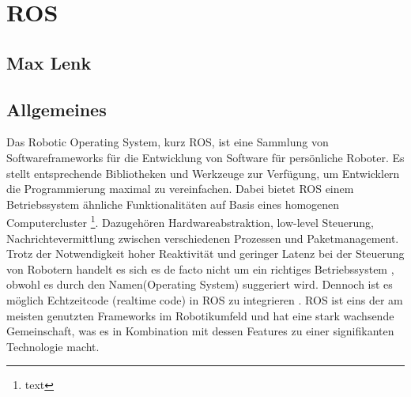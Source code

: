 \section{ROS}
\subsection*{Max Lenk}
\label{ROS}
\subsection{Allgemeines}
Das Robotic Operating System, kurz ROS, ist eine Sammlung von Softwareframeworks für die Entwicklung von Software für persönliche Roboter. Es stellt entsprechende Bibliotheken und Werkzeuge zur Verfügung, um Entwicklern die Programmierung maximal zu vereinfachen. Dabei bietet ROS einem Betriebssystem ähnliche Funktionalitäten auf Basis eines homogenen Computercluster \footnote{text}. Dazugehören Hardwareabstraktion, low-level Steuerung, Nachrichtevermittlung zwischen verschiedenen Prozessen und Paketmanagement. Trotz der Notwendigkeit hoher Reaktivität und geringer Latenz bei der Steuerung von Robotern handelt es sich es de facto nicht um ein richtiges Betriebssystem , obwohl es durch den Namen(\grqq Operating System\grqq) suggeriert wird. Dennoch ist es möglich Echtzeitcode (\grqq realtime code\grqq) in ROS zu integrieren \cite{realtimecode}. ROS ist eins der am meisten genutzten Frameworks im Robotikumfeld und hat eine stark wachsende Gemeinschaft, was es in Kombination mit dessen Features zu einer signifikanten Technologie macht.\cite{rosbook} \cite{rosgeneral}


